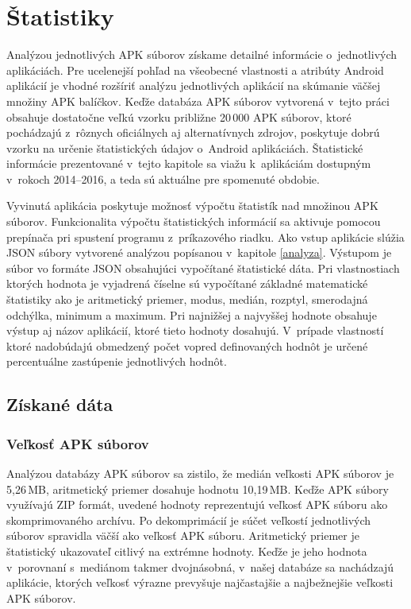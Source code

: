\chapter{Štatistiky}
\label{statistiky}
Analýzou jednotlivých APK súborov získame detailné informácie o~jednotlivých aplikáciách. Pre ucelenejší pohľad na všeobecné vlastnosti a atribúty Android aplikácií je vhodné rozšíriť analýzu jednotlivých aplikácií na skúmanie väčšej množiny APK balíčkov. Keďže databáza APK súborov vytvorená v~tejto práci obsahuje dostatočne veľkú vzorku približne 20\,000 APK súborov, ktoré pochádzajú z~rôznych oficiálnych aj alternatívnych zdrojov, poskytuje dobrú vzorku na určenie štatistických údajov o~Android aplikáciách. Štatistické informácie prezentované v~tejto kapitole sa viažu k~aplikáciám dostupným v~rokoch 2014--2016, a teda sú aktuálne pre spomenuté obdobie.

Vyvinutá aplikácia  poskytuje možnosť výpočtu štatistík nad množinou APK súborov. Funkcionalita výpočtu štatistických informácií sa aktivuje pomocou prepínača  pri spustení programu z~príkazového riadku. Ako vstup aplikácie slúžia JSON súbory vytvorené analýzou popísanou v~kapitole \ref{analyza}. Výstupom je súbor vo formáte JSON obsahujúci vypočítané štatistické dáta. Pri vlastnostiach ktorých hodnota je vyjadrená číselne sú vypočítané základné matematické štatistiky ako je aritmetický priemer, modus, medián, rozptyl, smerodajná odchýlka, minimum a maximum. Pri najnižšej a najvyššej hodnote obsahuje výstup aj názov aplikácií, ktoré tieto hodnoty dosahujú. V~prípade vlastností ktoré nadobúdajú obmedzený počet vopred definovaných hodnôt je určené percentuálne zastúpenie jednotlivých hodnôt.

\section{Získané dáta}
\subsection{Veľkosť APK súborov}
Analýzou databázy APK súborov sa zistilo, že medián veľkosti APK súborov je 5,26\,MB, aritmetický priemer dosahuje hodnotu 10,19\,MB. Keďže APK súbory využívajú ZIP formát, uvedené hodnoty reprezentujú veľkosť APK súboru ako skomprimovaného archívu. Po dekomprimácií je súčet veľkostí jednotlivých súborov spravidla väčší ako veľkosť APK súboru. Aritmetický priemer je štatistický ukazovateľ citlivý na extrémne hodnoty. Keďže je jeho hodnota v~porovnaní s~mediánom takmer dvojnásobná, v~našej databáze sa nachádzajú aplikácie, ktorých veľkosť výrazne prevyšuje najčastajšie a najbežnejšie veľkosti APK súborov. 

